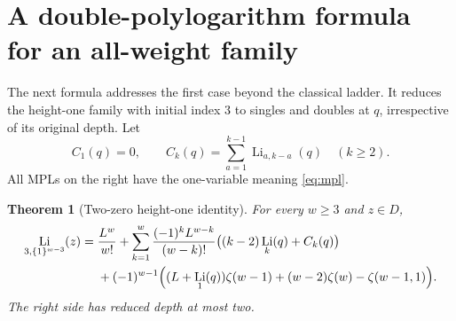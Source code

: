 \documentclass[11pt]{article}
\numberwithin{equation}{section}
\newtheorem{theorem}{Theorem}[section]
\theoremstyle{definition}\newtheorem{definition}[theorem]{Definition}
\theoremstyle{remark}\newtheorem{remark}[theorem]{Remark}
\DeclareMathOperator{\Li}{Li}
\newcommand{\ones}[1]{\{1\}^{#1}}
\begin{document}
\section{A double-polylogarithm formula for an all-weight family}

The next formula addresses the first case beyond the classical ladder.
It reduces the height-one family with initial index $3$ to singles and
doubles at $q$, irrespective of its original depth.
Let
\begin{equation}\label{eq:Ck}
 C_1(q)=0,\qquad C_k(q)=\sum_{a=1}^{k-1}\Li_{a,k-a}(q)\quad(k\ge2).
\end{equation}
All MPLs on the right have the one-variable meaning \eqref{eq:mpl}.

\begin{theorem}[Two-zero height-one identity]\label{thm:twozero}
For every $w\ge3$ and $z\in D$,
\begin{align}
\Li_{3,\ones{w-3}}(z)
={}&\frac{L^w}{w!}
 +\sum_{k=1}^{w}\frac{(-1)^kL^{w-k}}{(w-k)!}
   \bigl((k-2)\Li_k(q)+C_k(q)\bigr)\notag\\
&+(-1)^{w-1}\Bigl((L+\Li_1(q))\zeta(w-1)
 +(w-2)\zeta(w)-\zeta(w-1,1)\Bigr).
\label{eq:twozero}
\end{align}
The right side has reduced depth at most two.
\end{theorem}
\end{document}
